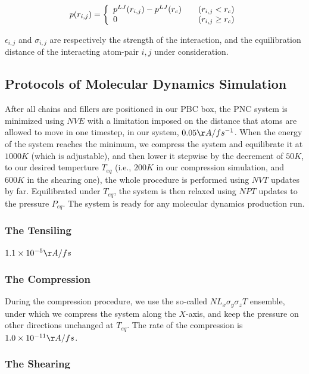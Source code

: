 \begin{equation}\label{eq:lj_cut}
p(r_{i,j})=
\left\{
\begin{array} {l l}
p^{LJ}(r_{i,j}) - p^{LJ}(r_{c}) & \quad (r_{i,j}<r_{c}) \\
0 & \quad (r_{i,j} \geq r_{c})
\end{array} 
\right.
\end{equation}

$\epsilon_{i,j}$ and $\sigma_{i,j}$ are respectively the strength of the interaction, and the equilibration distance of the interacting atom-pair $i, j$ under consideration.

\subsection*{Protocols of Molecular Dynamics Simulation}
After all chains and fillers are positioned in our PBC box, the PNC system is minimized using ${NVE}$ with a limitation imposed on the distance that atoms are allowed to move in one timestep, in our system, $0.05\AA/fs^{-1}$. When the energy of the system reaches the minimum, we compress the system and equilibrate it at $1000K$ (which is adjustable), and then lower it stepwise by the decrement of $50K$, to our desired temperture $T_{eq}$ (i.e., $200K$ in our compression simulation, and $600K$ in the shearing one), the whole procedure is performed using ${NVT}$ updates by far. Equilibrated under $T_{eq}$, the system is then relaxed using ${NPT}$ updates to the pressure $P_{eq}$. The system is ready for any molecular dynamics production run.

\subsubsection*{The Tensiling}
$1.1\times10^{-5}\AA/fs$

\subsubsection*{The Compression}
During the compression procedure, we use the so-called $NL_x\sigma_y\sigma_z T$ ensemble, under which we compress the system along the $X$-axis, and keep the pressure on other directions unchanged at $T_{eq}$. The rate of the compression is $1.0\times10^{-11}\AA/fs$.

\subsubsection*{The Shearing}


